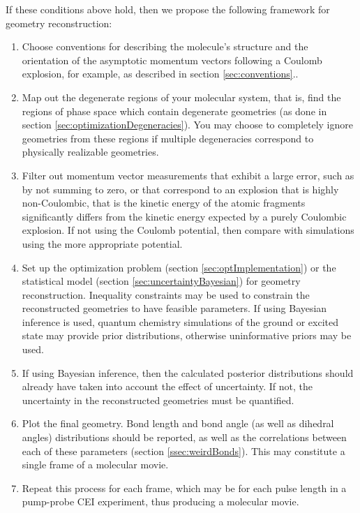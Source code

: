 If these conditions above hold, then we propose the following framework for geometry reconstruction:
\begin{enumerate}
  \item Choose conventions for describing the molecule's structure and the orientation of the asymptotic momentum vectors following a Coulomb explosion, for example, as described in section \ref{sec:conventions}..
  \item Map out the degenerate regions of your molecular system, that is, find the regions of phase space which contain degenerate geometries (as done in section \ref{sec:optimizationDegeneracies}). You may choose to completely ignore geometries from these regions if multiple degeneracies correspond to physically realizable geometries.
  \item Filter out momentum vector measurements that exhibit a large error, such as by not summing to zero, or that correspond to an explosion that is highly non-Coulombic, that is the kinetic energy of the atomic fragments significantly differs from the kinetic energy expected by a purely Coulombic explosion. If not using the Coulomb potential, then compare with simulations using the more appropriate potential.
  \item Set up the optimization problem (section \ref{sec:optImplementation}) or the statistical model (section \ref{sec:uncertaintyBayesian}) for geometry reconstruction. Inequality constraints may be used to constrain the reconstructed geometries to have feasible parameters. If using Bayesian inference is used, quantum chemistry simulations of the ground or excited state may provide prior distributions, otherwise uninformative priors may be used.
  \item If using Bayesian inference, then the calculated posterior distributions should already have taken into account the effect of uncertainty. If not, the uncertainty in the reconstructed geometries must be quantified.
  \item Plot the final geometry. Bond length and bond angle (as well as dihedral angles) distributions should be reported, as well as the correlations between each of these parameters (section \ref{ssec:weirdBonds}). This may constitute a single frame of a molecular movie.
  \item Repeat this process for each frame, which may be for each pulse length in a pump-probe CEI experiment, thus producing a molecular movie.
\end{enumerate}

